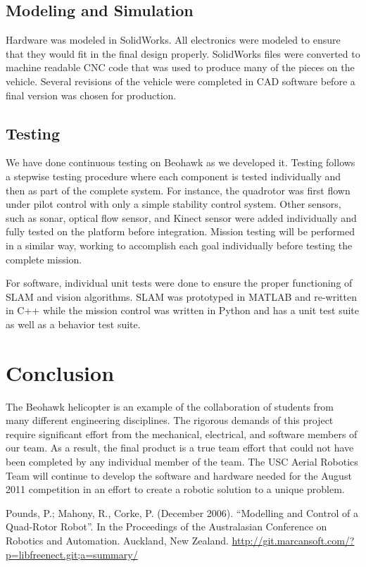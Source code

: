 \documentclass[12pt, letterpaper]{article}
\begin{document}
\subsection{Modeling and Simulation}
Hardware was modeled in SolidWorks. All electronics were modeled to ensure that they would fit in the final design properly. SolidWorks files were converted to machine readable CNC code that was used to produce many of the pieces on the vehicle. Several revisions of the vehicle were completed in CAD software before a final version was chosen for production.

\subsection{Testing}
We have done continuous testing on Beohawk as we developed it. Testing follows a stepwise testing procedure where each component is tested individually and then as part of the complete system. For instance, the quadrotor was first flown under pilot control with only a simple stability control system. Other sensors, such as sonar, optical flow sensor, and Kinect sensor were added individually and fully tested on the platform before integration. Mission testing will be performed in a similar way, working to accomplish each goal individually before testing the complete mission.

For software, individual unit tests were done to ensure the proper functioning of SLAM and vision algorithms.  SLAM was prototyped in MATLAB and re-written in C++ while the mission control was written in Python and has a unit test suite as well as a behavior test suite. 

\section{Conclusion}
The Beohawk helicopter is an example of the collaboration of students from many different engineering disciplines. The rigorous demands of this project require significant effort from the mechanical, electrical, and software members of our team. As a result, the final product is a true team effort that could not have been completed by any individual member of the team. The USC Aerial Robotics Team will continue to develop the software and hardware needed for the August 2011 competition in an effort to create a robotic solution to a unique problem.



\begin{thebibliography}{10}
Pounds, P.; Mahony, R., Corke, P. (December 2006). ``Modelling and Control of a Quad-Rotor Robot''. In the Proceedings of the Australasian Conference on Robotics and Automation. Auckland, New Zealand.
 \url{http://git.marcansoft.com/?p=libfreenect.git;a=summary/}
\end{thebibliography}
\end{document}
